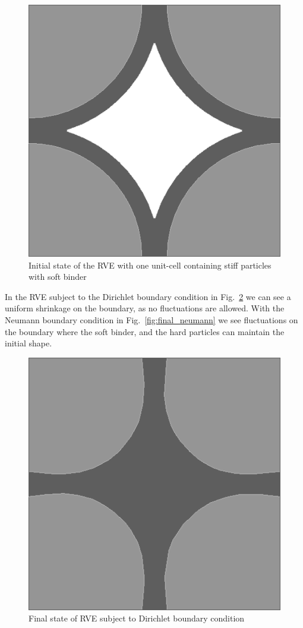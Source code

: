 \documentclass[notitlepage,a4paper,fleqn,9pt]{extarticle}
\newcommand{\figref}[1]{Fig.~\ref{#1}}
\begin{document}
\begin{multicols}{2}
\begin{figure}[H]
 \centering
 \includegraphics[scale=0.25]{figures/initial_rve}
 \caption{Initial state of the RVE with one unit-cell containing stiff particles with soft binder}
 \label{fig:initial_rve}
\end{figure}

In the RVE subject to the Dirichlet boundary condition in \figref{fig:final_dirichlet} we can see a uniform shrinkage on the boundary, as no fluctuations are allowed. 
With the Neumann boundary condition in \figref{fig:final_neumann} we see fluctuations on the boundary where the soft binder, and the hard particles can maintain the initial shape.

\begin{figure}[H]
 \centering
 \includegraphics[scale=0.25]{figures/final_dirichlet}
 \caption{Final state of RVE subject to Dirichlet boundary condition}
 \label{fig:final_dirichlet}
\end{figure}


\end{multicols}
\end{document}
